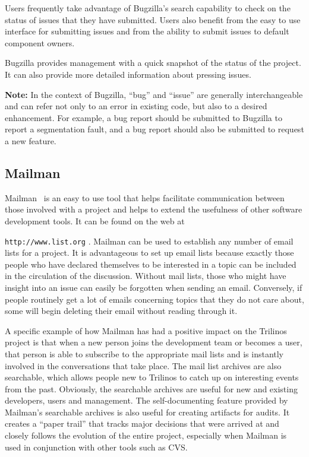 \documentclass[12pt,relax]{article}
\newcommand{\InlineDirectory}[1]{
  {\hspace{0.01 in}} {\tt #1} {\hspace{0.01 in}}}
\begin{document}
Users frequently take advantage of Bugzilla's search capability to check on 
the status of issues that they have submitted.  Users also benefit from the 
easy to use interface for submitting issues and from the ability to submit 
issues to default component owners.  

Bugzilla provides management with a quick snapshot of the status of the 
project.  It can also provide more detailed information about pressing issues.

{\bf Note:} In the context of Bugzilla, ``bug'' and ``issue'' are generally 
interchangeable and can refer not only to an error in 
existing code, but also to a desired enhancement.  For example, a bug report 
should be submitted to Bugzilla to report a segmentation fault, and a bug 
report should also be submitted to request a new feature.

\subsection{Mailman}
\label{subsect:MailMan}
Mailman~\cite{Mailman} is an easy to use tool that helps facilitate 
communication between
those involved with a project and helps to extend the usefulness of other 
software development tools.  It can be found on the web at 
\InlineDirectory{http://www.list.org}.  Mailman can be used to establish any 
number of 
email lists for a project.  It is advantageous to set up email lists because exactly 
those people who have declared themselves to be interested in a 
topic can be included in the circulation of the discussion.  Without 
mail lists, those who might have insight into an issue can easily be forgotten 
when sending an email.  Conversely, if people routinely get a lot of emails 
concerning topics that they do not care about, some will begin deleting
their email without reading through it.  

A specific example of how Mailman 
has had a positive impact on the Trilinos project is that when a new person
joins the development team or becomes a user, that person is able to 
subscribe to the appropriate mail lists and is instantly involved in the 
conversations that take place.  The mail list archives are also searchable, 
which allows people new to Trilinos to catch up on interesting events from the 
past.  Obviously, the searchable archives are useful for new and existing 
developers, users and management.  The self-documenting feature provided 
by Mailman's searchable archives is also useful for creating artifacts for 
audits.  It creates a ``paper trail'' that tracks major decisions that were 
arrived at and closely follows 
the evolution of the entire project, especially when Mailman is used in 
conjunction with other tools such as CVS.
\end{document}
